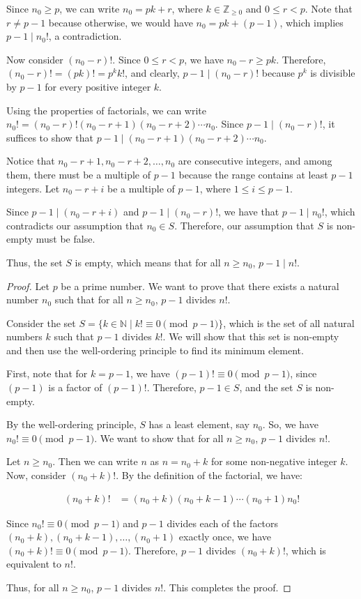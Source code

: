 \documentclass[12pt,openany]{book}
\theoremstyle{definition}
\begin{document}
	Since $n_0 \geq p$, we can write $n_0 = pk + r$, where $k \in \mathbb{Z}_{\geq 0}$ and $0 \leq r < p$. Note that $r \neq p-1$ because otherwise, we would have $n_0 = pk + (p-1)$, which implies $p-1 \mid n_0!$, a contradiction.
	
	Now consider $(n_0 - r)!$. Since $0 \leq r < p$, we have $n_0 - r \geq pk$. Therefore, $(n_0 - r)! = (pk)! = p^k k!$, and clearly, $p-1 \mid (n_0 - r)!$ because $p^k$ is divisible by $p-1$ for every positive integer $k$.
	
	Using the properties of factorials, we can write $n_0! = (n_0 - r)!(n_0 - r + 1)(n_0 - r + 2) \cdots n_0$. Since $p-1 \mid (n_0 - r)!$, it suffices to show that $p-1 \mid (n_0 - r + 1)(n_0 - r + 2) \cdots n_0$.
	
	Notice that $n_0 - r + 1, n_0 - r + 2, \dots, n_0$ are consecutive integers, and among them, there must be a multiple of $p-1$ because the range contains at least $p-1$ integers. Let $n_0 - r + i$ be a multiple of $p-1$, where $1 \leq i \leq p-1$.
	
	Since $p-1 \mid (n_0 - r + i)$ and $p-1 \mid (n_0 - r)!$, we have that $p-1 \mid n_0!$, which contradicts our assumption that $n_0 \in S$. Therefore, our assumption that $S$ is non-empty must be false.
	
	Thus, the set $S$ is empty, which means that for all $n \geq n_0$, $p-1 \mid n!$.
	
	\newpage
	
	\begin{proof}
		Let $p$ be a prime number. We want to prove that there exists a natural number $n_0$ such that for all $n \geq n_0$, $p-1$ divides $n!$. 
		
		Consider the set $S = \{k \in \mathbb{N} \mid k! \equiv 0 \pmod{p-1}\}$, which is the set of all natural numbers $k$ such that $p-1$ divides $k!$. We will show that this set is non-empty and then use the well-ordering principle to find its minimum element.
		
		First, note that for $k = p-1$, we have $(p-1)! \equiv 0 \pmod{p-1}$, since $(p-1)$ is a factor of $(p-1)!$. Therefore, $p-1 \in S$, and the set $S$ is non-empty.
		
		By the well-ordering principle, $S$ has a least element, say $n_0$. So, we have $n_0! \equiv 0 \pmod{p-1}$. We want to show that for all $n \geq n_0$, $p-1$ divides $n!$.
		
		Let $n \geq n_0$. Then we can write $n$ as $n = n_0 + k$ for some non-negative integer $k$. Now, consider $(n_0 + k)!$. By the definition of the factorial, we have:
		
		\begin{align*}
		(n_0 + k)! &= (n_0 + k)(n_0 + k - 1) \cdots (n_0 + 1)n_0!
		\end{align*}
		
		Since $n_0! \equiv 0 \pmod{p-1}$ and $p-1$ divides each of the factors $(n_0 + k), (n_0 + k - 1), \ldots, (n_0 + 1)$ exactly once, we have $(n_0 + k)! \equiv 0 \pmod{p-1}$. Therefore, $p-1$ divides $(n_0 + k)!$, which is equivalent to $n!$.
		
		Thus, for all $n \geq n_0$, $p-1$ divides $n!$. This completes the proof.
	\end{proof}
	
\end{document}

